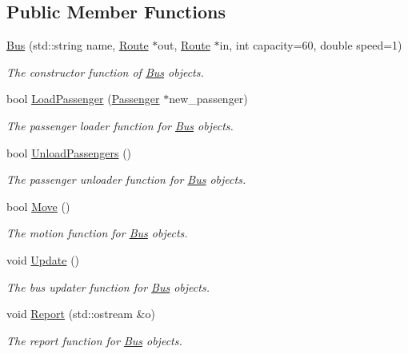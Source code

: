 \subsection*{Public Member Functions}
\begin{DoxyCompactItemize}
\item 
\hyperlink{classBus_aa28c3c318b6993f3a3aebf211daa9217}{Bus} (std\+::string name, \hyperlink{classRoute}{Route} $\ast$out, \hyperlink{classRoute}{Route} $\ast$in, int capacity=60, double speed=1)
\begin{DoxyCompactList}\small\item\em The constructor function of \hyperlink{classBus}{Bus} objects. \end{DoxyCompactList}\item 
bool \hyperlink{classBus_aae72290f9daf683b3068428eee0a9ee7}{Load\+Passenger} (\hyperlink{classPassenger}{Passenger} $\ast$new\+\_\+passenger)
\begin{DoxyCompactList}\small\item\em The passenger loader function for \hyperlink{classBus}{Bus} objects. \end{DoxyCompactList}\item 
bool \hyperlink{classBus_a352bd5f926705ed4dd91d7fdea6a7fc9}{Unload\+Passengers} ()
\begin{DoxyCompactList}\small\item\em The passenger unloader function for \hyperlink{classBus}{Bus} objects. \end{DoxyCompactList}\item 
bool \hyperlink{classBus_a5e667186d6db0916ebab0e4eff3312c8}{Move} ()
\begin{DoxyCompactList}\small\item\em The motion function for \hyperlink{classBus}{Bus} objects. \end{DoxyCompactList}\item 
void \hyperlink{classBus_a9896f74f16966f7621d0dfafff0ec6b4}{Update} ()
\begin{DoxyCompactList}\small\item\em The bus updater function for \hyperlink{classBus}{Bus} objects. \end{DoxyCompactList}\item 
void \hyperlink{classBus_a695e790984f5cf7bbec85fe422466b48}{Report} (std\+::ostream \&o)
\begin{DoxyCompactList}\small\item\em The report function for \hyperlink{classBus}{Bus} objects. \end{DoxyCompactList}\item 

\end{DoxyCompactItemize}
